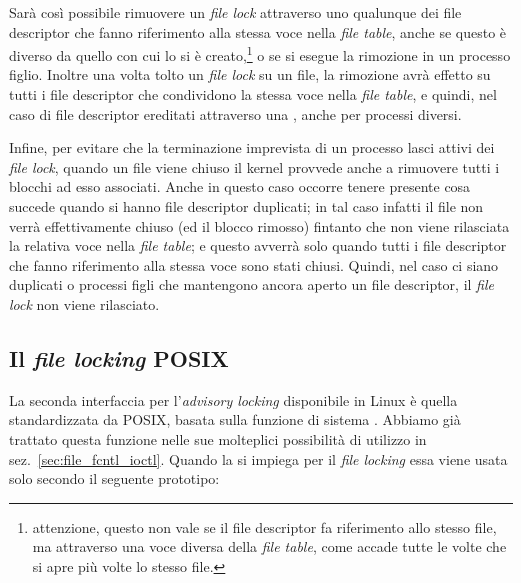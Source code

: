 Sarà così possibile rimuovere un \textit{file lock} attraverso uno qualunque
dei file descriptor che fanno riferimento alla stessa voce nella \textit{file
  table}, anche se questo è diverso da quello con cui lo si è
creato,\footnote{attenzione, questo non vale se il file descriptor fa
  riferimento allo stesso file, ma attraverso una voce diversa della
  \textit{file table}, come accade tutte le volte che si apre più volte lo
  stesso file.} o se si esegue la rimozione in un processo figlio. Inoltre una
volta tolto un \textit{file lock} su un file, la rimozione avrà effetto su
tutti i file descriptor che condividono la stessa voce nella \textit{file
  table}, e quindi, nel caso di file descriptor ereditati attraverso una
, anche per processi diversi.

Infine, per evitare che la terminazione imprevista di un processo lasci attivi
dei \textit{file lock}, quando un file viene chiuso il kernel provvede anche a
rimuovere tutti i blocchi ad esso associati. Anche in questo caso occorre
tenere presente cosa succede quando si hanno file descriptor duplicati; in tal
caso infatti il file non verrà effettivamente chiuso (ed il blocco rimosso)
fintanto che non viene rilasciata la relativa voce nella \textit{file table};
e questo avverrà solo quando tutti i file descriptor che fanno riferimento
alla stessa voce sono stati chiusi.  Quindi, nel caso ci siano duplicati o
processi figli che mantengono ancora aperto un file descriptor, il
\textit{file lock} non viene rilasciato.
 

\subsection{Il \textit{file locking} POSIX}
\label{sec:file_posix_lock}

La seconda interfaccia per l'\textit{advisory locking} disponibile in Linux è
quella standardizzata da POSIX, basata sulla funzione di sistema
. Abbiamo già trattato questa funzione nelle sue molteplici
possibilità di utilizzo in sez.~\ref{sec:file_fcntl_ioctl}. Quando la si
impiega per il \textit{file locking} essa viene usata solo secondo il seguente
prototipo:


